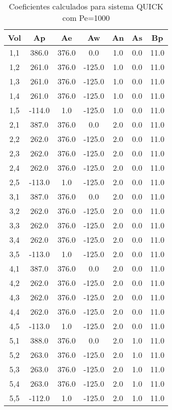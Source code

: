 \documentclass[]{article}
\begin{document}
\begin{table}[H]
	\centering
	\begin{tabular}{|c|c|c|c|c|c|c|}
		\hline
		\textbf{Vol} & \textbf{Ap} & \textbf{Ae} & \textbf{Aw} & \textbf{An} & \textbf{As} & \textbf{Bp} \\
		\hline
		1,1  & 386.0  & 376.0  & 0.0  & 1.0  & 0.0  & 11.0 \\
		1,2  & 261.0  & 376.0  & -125.0 & 1.0  & 0.0  & 11.0 \\
		1,3  & 261.0  & 376.0  & -125.0 & 1.0  & 0.0  & 11.0 \\
		1,4  & 261.0  & 376.0  & -125.0 & 1.0  & 0.0  & 11.0 \\
		1,5  & -114.0 & 1.0    & -125.0 & 1.0  & 0.0  & 11.0 \\
		2,1  & 387.0  & 376.0  & 0.0  & 2.0  & 0.0  & 11.0 \\
		2,2  & 262.0  & 376.0  & -125.0 & 2.0  & 0.0  & 11.0 \\
		2,3  & 262.0  & 376.0  & -125.0 & 2.0  & 0.0  & 11.0 \\
		2,4  & 262.0  & 376.0  & -125.0 & 2.0  & 0.0  & 11.0 \\
		2,5  & -113.0 & 1.0    & -125.0 & 2.0  & 0.0  & 11.0 \\
		3,1  & 387.0  & 376.0  & 0.0  & 2.0  & 0.0  & 11.0 \\
		3,2  & 262.0  & 376.0  & -125.0 & 2.0  & 0.0  & 11.0 \\
		3,3  & 262.0  & 376.0  & -125.0 & 2.0  & 0.0  & 11.0 \\
		3,4  & 262.0  & 376.0  & -125.0 & 2.0  & 0.0  & 11.0 \\
		3,5  & -113.0 & 1.0    & -125.0 & 2.0  & 0.0  & 11.0 \\
		4,1  & 387.0  & 376.0  & 0.0  & 2.0  & 0.0  & 11.0 \\
		4,2  & 262.0  & 376.0  & -125.0 & 2.0  & 0.0  & 11.0 \\
		4,3  & 262.0  & 376.0  & -125.0 & 2.0  & 0.0  & 11.0 \\
		4,4  & 262.0  & 376.0  & -125.0 & 2.0  & 0.0  & 11.0 \\
		4,5  & -113.0 & 1.0    & -125.0 & 2.0  & 0.0  & 11.0 \\
		5,1  & 388.0  & 376.0  & 0.0  & 2.0  & 1.0  & 11.0 \\
		5,2  & 263.0  & 376.0  & -125.0 & 2.0  & 1.0  & 11.0 \\
		5,3  & 263.0  & 376.0  & -125.0 & 2.0  & 1.0  & 11.0 \\
		5,4  & 263.0  & 376.0  & -125.0 & 2.0  & 1.0  & 11.0 \\
		5,5  & -112.0 & 1.0    & -125.0 & 2.0  & 1.0  & 11.0 \\
		\hline
	\end{tabular}
	\caption{Coeficientes calculados para sistema QUICK com Pe=1000}
\end{table}
\end{document}
